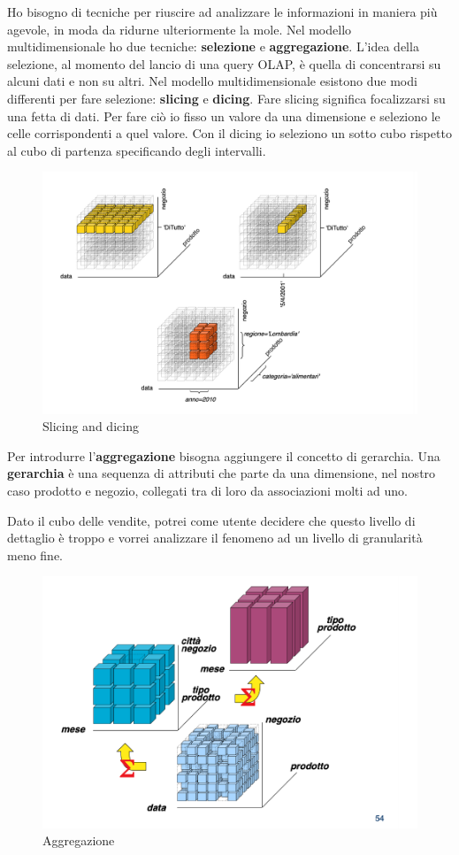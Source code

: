Ho bisogno di tecniche per riuscire ad analizzare le informazioni in maniera più agevole, in moda da ridurne ulteriormente la mole. Nel modello multidimensionale ho due tecniche: \textbf{selezione} e \textbf{aggregazione}. L’idea della selezione, al momento del lancio di una query OLAP, è quella di concentrarsi su alcuni dati e non su altri. Nel modello multidimensionale esistono due modi differenti per fare selezione: \textbf{slicing} e \textbf{dicing}. Fare slicing significa focalizzarsi su una fetta di dati. Per fare ciò io fisso un valore da una dimensione e seleziono le celle corrispondenti a quel valore. Con il dicing io seleziono un sotto cubo rispetto al cubo di partenza specificando degli intervalli. 
\begin{figure}[H]
	\centering
	\includegraphics[width=0.5\linewidth]{img/slicing&dicing}
	\caption{Slicing and dicing}
	\label{fig:slice}
\end{figure}

Per introdurre l’\textbf{aggregazione} bisogna aggiungere il concetto di gerarchia. Una \textbf{gerarchia} è una sequenza di attributi che parte da una dimensione, nel nostro caso prodotto e negozio, collegati tra di loro da associazioni molti ad uno. 

Dato il cubo delle vendite, potrei come utente decidere che questo livello di dettaglio è troppo e vorrei analizzare il fenomeno ad un livello di granularità meno fine.
\begin{figure}[H]
	\centering
	\includegraphics[width=0.6\linewidth]{img/gran}
	\caption{Aggregazione}
	\label{fig:aggregazione}
\end{figure}
